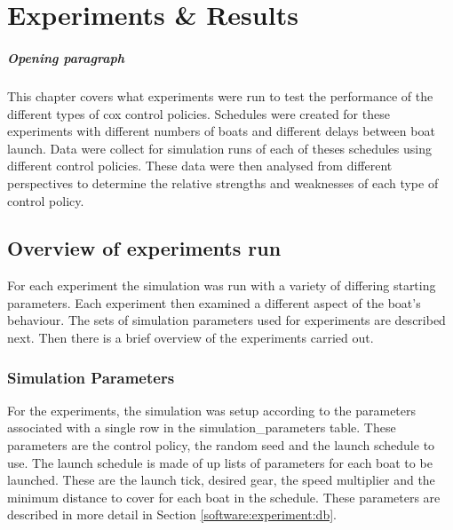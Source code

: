 \chapter{Experiments \& Results}\label{chapter:experiments}
\paragraph{Opening paragraph}
This chapter covers what experiments were run to test the performance of the different types of cox control policies. Schedules were created for these experiments with different numbers of boats and different delays between boat launch. Data were collect for simulation runs of each of theses schedules using different control policies. These data were then analysed from different perspectives to determine the relative strengths and weaknesses of each type of control policy.

\section{Overview of experiments run}
  For each experiment the simulation was run with a variety of
  differing starting parameters. Each experiment then examined a
  different aspect of the boat's behaviour. The sets of simulation
  parameters used for experiments are described next. Then there is a
  brief overview of the experiments carried out.

  \subsection{Simulation Parameters}
  For the experiments, the simulation was setup according to the
  parameters associated with a single row in the
  simulation\_parameters table. These parameters are the control
  policy, the random seed and the launch schedule to use. The launch
  schedule is made of up lists of parameters for each boat to be
  launched. These are the launch tick, desired gear, the speed
  multiplier and the minimum distance to cover for each boat in the
  schedule. These parameters are described in more detail in Section \ref{software:experiment:db}.
  
